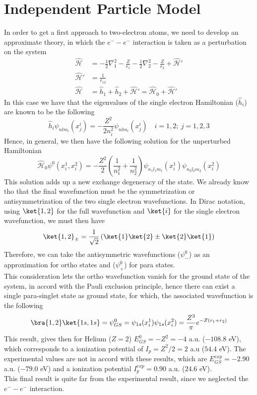 \documentclass[a4paper, 11pt]{book}
\newcommand{\1}{\opr{\mathds{1}}}
\newcommand{\ham}{\mathcal{H}}
\newcommand{\opr}[1]{\hat{#1}}
\theoremstyle{plain}
\begin{document}
	\section{Independent Particle Model}
	In order to get a first approach to two-electron atoms, we need to develop an approximate theory, in which the $e^--e^-$ interaction is taken as a perturbation on the system
	\begin{equation}
		\begin{aligned}
			\opr{\ham}&=-\frac{1}{2}\nabla^2_1-\frac{Z}{r_1}-\frac{1}{2}\nabla^2_2-\frac{Z}{r_2}+\opr{\ham}'\\
			\opr{\ham}'&=\frac{1}{r_{12}}\\
			\opr{\ham}&=\opr{h}_1+\opr{h}_2+\opr{\ham}'=\opr{\ham}_0+\opr{\ham}'
		\end{aligned}
		\label{eq:indepparticles}
	\end{equation}
	In this case we have that the eigenvalues of the single electron Hamiltonian ($\opr{h}_i$) are known to be the following
	\begin{equation*}
		\opr{h}_i\psi_{nlm_i}(x^i_j)=-\frac{Z^2}{2n_i^2}\psi_{nlm_i}(x^i_j)\quad i=1,2;\ j=1,2,3
	\end{equation*}
	Hence, in general, we then have the following solution for the unperturbed Hamiltonian
	\begin{equation}
		\opr{\ham}_0\psi^0(x^1_i,x^2_i)=-\frac{Z^2}{2}\left( \frac{1}{n_1^2}+\frac{1}{n_2^2} \right)\psi_{n_1l_1m_1}(x_i^1)\psi_{n_2l_2m_2}(x_i^2)
		\label{eq:unpertsol2el}
	\end{equation}
	This solution adds up a new exchange degeneracy of the state. We already know tho that the final wavefunction must be the symmetrization or antisymmetrization of the two single electron wavefunctions. In Dirac notation, using $\ket{1,2}$ for the full wavefunction and $\ket{i}$ for the single electron wavefunction, we must then have
	\begin{equation}
		\ket{1,2}_{\pm}=\frac{1}{\sqrt{2}}\left( \ket{1}\ket{2}\pm\ket{2}\ket{1} \right)
		\label{eq:twoelectronatomwf}
	\end{equation}
	Therefore, we can take the antisymmetric wavefunctions ($\psi^0_-$) as an approximation for ortho states and ($\psi^0_+$) for para states.\\
	This consideration lets the ortho wavefunction vanish for the ground state of the system, in accord with the Pauli exclusion principle, hence there can exist a single para-singlet state as ground state, for which, the associated wavefunction is the following
	\begin{equation}
		\bra{1,2}\ket{1s,1s}=\psi_{GS}^0=\psi_{1s}(x_i^1)\psi_{1s}(x_i^2)=\frac{Z^3}{\pi}e^{-Z(r_1+r_2)}
		\label{eq:independentgs}
	\end{equation}
	This result, gives then for Helium ($Z=2$) $E_{GS}^0=-Z^2=-4$ a.u. ($-108.8$ eV), which corresponds to a ionization potential of $I_p=Z^2/2=2$ a.u ($54.4$ eV). The experimental values are not in accord with these results, which are $E_{GS}^{exp}=-2.90$ a.u. ($-79.0$ eV) and a ionization potential $I_p^{exp}=0.90$ a.u. ($24.6$ eV).\\
	This final result is quite far from the experimental result, since we neglected the $e^--e^-$ interaction.
\end{document}
